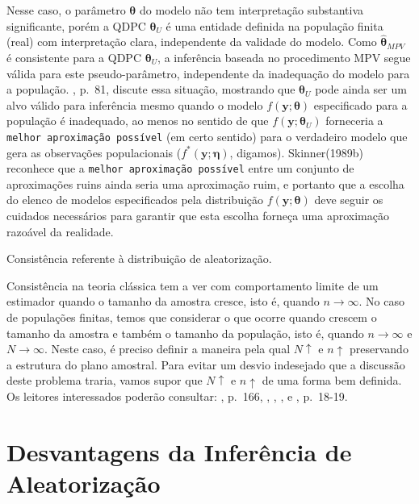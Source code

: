 \documentclass[]{book}
\numberwithin{example}{chapter}
\numberwithin{remark}{chapter}
\numberwithin{definition}{chapter}
\let\BeginKnitrBlock\begin \let\EndKnitrBlock\end
\begin{document}
Nesse caso, o parâmetro \(\mathbf{\theta }\) do modelo não tem
interpretação substantiva significante, porém a QDPC
\(\mathbf{\theta }_{U}\) é uma entidade definida na população finita
(real) com interpretação clara, independente da validade do modelo. Como
\(\mathbf{\hat{\theta}}_{MPV}\) é consistente para a QDPC
\(\mathbf{\theta}_{U}\), a inferência baseada no procedimento MPV segue
válida para este pseudo-parâmetro, independente da inadequação do modelo
para a população. \citep{Sk89b}, p.~81, discute essa situação, mostrando
que \(\mathbf{\theta }_{U}\) pode ainda ser um alvo válido para
inferência mesmo quando o modelo
\(f\left( \mathbf{y};\mathbf{\theta }\right)\) especificado para a
população é inadequado, ao menos no sentido de que
\(f\left( \mathbf{y};\mathbf{\theta}_{U}\right)\) forneceria a
\texttt{melhor\ aproximação\ possível} (em certo sentido) para o
verdadeiro modelo que gera as observações populacionais
(\(f^{*}\left( \mathbf{y};\mathbf{\eta }\right)\), digamos).
Skinner(1989b) reconhece que a \texttt{melhor\ aproximação\ possível}
entre um conjunto de aproximações ruins ainda seria uma aproximação
ruim, e portanto que a escolha do elenco de modelos especificados pela
distribuição \(f\left( \mathbf{y};\mathbf{\theta }\right)\) deve seguir
os cuidados necessários para garantir que esta escolha forneça uma
aproximação razoável da realidade.

\BeginKnitrBlock{remark}
Consistência referente à distribuição de
aleatorização.
\EndKnitrBlock{remark}

Consistência na teoria clássica tem a ver com comportamento limite de um
estimador quando o tamanho da amostra cresce, isto é, quando
\(n\rightarrow \infty\). No caso de populações finitas, temos que
considerar o que ocorre quando crescem o tamanho da amostra e também o
tamanho da população, isto é, quando \(n\rightarrow \infty\) e
\(N\rightarrow \infty\). Neste caso, é preciso definir a maneira pela
qual \(N\uparrow\) e \(n\uparrow\) preservando a estrutura do plano
amostral. Para evitar um desvio indesejado que a discussão deste
problema traria, vamos supor que \(N\uparrow\) e \(n\uparrow\) de uma
forma bem definida. Os leitores interessados poderão consultar:
\citep{SSW92}, p.~166, \citep{brewer}, \citep{Isaki}, \citep{Robin},
\citep{hajek} e \citep{SHS89}, p.~18-19.

\section{Desvantagens da Inferência de
Aleatorização}\label{desvantagens-da-inferencia-de-aleatorizacao}
\end{document}
